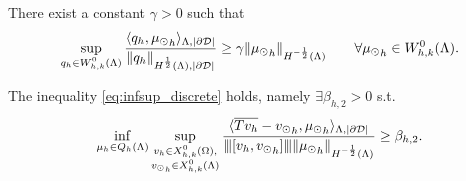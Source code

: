 \begin{lemma}\label{infsup_avr_trspace}
There exist a constant $\gamma >0$ such that
\begin{equation*}
\sup_{\substack{q_h \in W_{h,k}^0(\Lambda)}} \frac{\langle q_h , {\mu_{\odot}}_h \rangle_{\Lambda, |\partial\mathcal{D}|}}{ \|q_h\|_{H^{\frac 12}(\Lambda),|\partial\mathcal{D}|}} \geq \gamma \|{\mu_{\odot}}_h\|_{H^{-\frac 12}(\Lambda)} \qquad \forall {\mu_{\odot}}_h \in W_{h,k}^0(\Lambda).
\end{equation*} 
\end{lemma}

\begin{theorem} The inequality \eqref{eq:infsup_discrete} holds, namely 
$\exists \beta_{h,2} >0$ s.t.
\begin{equation}
\inf_{\mu_h \in Q_h(\Lambda)} 
\sup_{\substack{v_h \in X^0_{h,k}(\Omega),\\ {v_{\odot}}_h \in X^0_{h,k}(\Lambda)} }\frac{\langle \overline{Tv_h} -  {v_{\odot}}_h, {\mu_{\odot}}_h \rangle _{\Lambda,|\partial\mathcal{D}|} } {{\left\vert\kern-0.25ex\left\vert\kern-0.25ex\left\vert [v_h, {v_{\odot}}_h] \right\vert\kern-0.25ex\right\vert\kern-0.25ex\right\vert} \|{\mu_{\odot}}_h\|_{H^{-\frac 12 }(\Lambda)} } 
\geq \beta_{h,2}. 
\end{equation}
\end{theorem}

